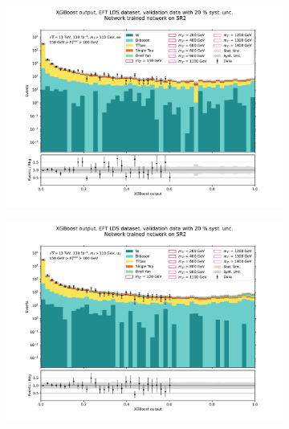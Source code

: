 \documentclass[12pt, a4paper]{book}
\begin{document}
\begin{figure}[!ht]
	\centering
	\begin{subfigure}[b]{0.49\textwidth}
      \centering
      \includegraphics[width=1\textwidth]{XGBoost/Model_independent/100-150/EFT_LDS/VAL_ee.pdf}
   \end{subfigure}
   \hfill
   \begin{subfigure}[b]{0.49\textwidth}
      \centering
      \includegraphics[width=1\textwidth]{XGBoost/Model_independent/100-150/EFT_LDS/VAL_uu.pdf}
   \end{subfigure}
   \hfill
   \begin{subfigure}[b]{0.49\textwidth}
      \centering

\end{subfigure}
\end{figure}
\end{document}

